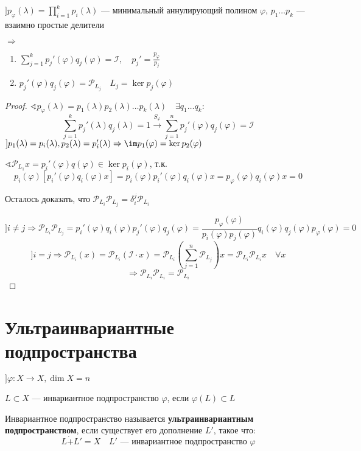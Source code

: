 \begin{theorem}
    $] p_\varphi(\lambda) = \prod\limits_{i=1}^k p_i(\lambda)$ --- минимальный аннулирующий полином $\varphi$, $p_1\ldots p_k$ --- взаимно простые делители

    $\Rightarrow$
    \begin{enumerate}
        \item $\sum\limits_{j=1}^k p_j'(\varphi)q_j(\varphi)=\mathcal I, \quad p_j'=\frac{p_\varphi}{p_j}$
        \item $p_j'(\varphi)q_j(\varphi)=\mathcal P_{L_j} \quad L_j=\ker p_j(\varphi)$
    \end{enumerate}
\end{theorem}
\begin{proof}
    $\sphericalangle p_\varphi(\lambda) = p_1(\lambda)p_2(\lambda)\ldots p_k(\lambda) \quad \exists q_1\ldots q_k :$
    $$\sum_{j=1}^k p_j'(\lambda)q_j(\lambda)=1 \xrightarrow{S_\varphi} \sum_{j=1}^n p_j'(\varphi)q_j(\varphi)=\mathcal I$$
    $] p_1(\lambda)=p_i(\lambda), p_2(\lambda)=p_i'(\lambda) \Rightarrow \im p_1(\varphi) = \ker p_2(\varphi)$

    $\sphericalangle \mathcal P_{L_1} x = p_i'(\varphi)q(\varphi) \in \ker p_i(\varphi)$, т.к.
    $$p_i(\varphi)[p_i'(\varphi)q_i(\varphi) x]=p_i(\varphi)p_i'(\varphi)q_i(\varphi)x=p_\varphi(\varphi)q_i(\varphi)x=0$$

    Осталось доказать, что $\mathcal P_{L_i}\mathcal P_{L_j}=\delta_i^j \mathcal P_{L_i}$

    $$] i\not=j \Rightarrow \mathcal P_{L_i}\mathcal P_{L_j}=p_i'(\varphi)q_i(\varphi)p_j'(\varphi)q_j(\varphi)=\frac{p_\varphi(\varphi)}{p_i(\varphi)p_j(\varphi)}q_i(\varphi)q_j(\varphi)p_\varphi(\varphi)=0$$
    $$] i = j \Rightarrow \mathcal P_{L_i} (x) = \mathcal P_{L_i} (\mathcal I \cdot x)=\mathcal P_{L_i} \left(\sum_{j=1}^n \mathcal P_{L_j}\right) x=\mathcal P_{L_i}\mathcal P_{L_i} x \quad \forall x$$
    $$\Rightarrow \mathcal P_{L_i}\mathcal P_{L_i}=\mathcal P_{L_i}$$
\end{proof}

\section*{Ультраинвариантные подпространства}

$] \varphi : X\to X, \dim X = n$

$L\subset X$ --- инвариантное подпространство $\varphi$, если $\varphi(L)\subset L$

\begin{definition}
    Инвариантное подпространство называется \textbf{ультраинвариантным подпространством}, если существует его дополнение $L'$, такое что:
    $$L\dot + L'=X \quad L' \text{ --- инвариантное подпространство }\varphi$$
\end{definition}

